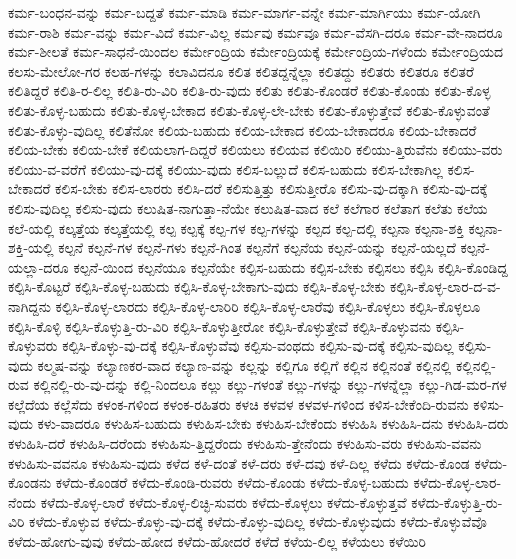 {ಕರ್ಮ-ಬಂಧನ-ವನ್ನು
ಕರ್ಮ-ಬದ್ದತೆ
ಕರ್ಮ-ಮಾಡಿ
ಕರ್ಮ-ಮಾರ್ಗ-ವನ್ನೇ
ಕರ್ಮ-ಮಾರ್ಗಿಯು
ಕರ್ಮ-ಯೋಗಿ
ಕರ್ಮ-ರಾಶಿ
ಕರ್ಮ-ವನ್ನು
ಕರ್ಮ-ವಿದೆ
ಕರ್ಮ-ವಿಲ್ಲ
ಕರ್ಮವು
ಕರ್ಮವೂ
ಕರ್ಮ-ವೆಸಗಿ-ದರೂ
ಕರ್ಮ-ವೇ-ನಾದರೂ
ಕರ್ಮ-ಶೀಲತೆ
ಕರ್ಮ-ಸಾಧನೆ-ಯಿಂದಲ
ಕರ್ಮೇಂದ್ರಿಯ
ಕರ್ಮೇಂದ್ರಿಯಕ್ಕೆ
ಕರ್ಮೇಂದ್ರಿಯ-ಗಳೆಂದು
ಕರ್ಮೇಂದ್ರಿಯದ
ಕಲಸು-ಮೇಲೋ-ಗರ
ಕಲಹ-ಗಳನ್ನು
ಕಲಾವಿದನೂ
ಕಲಿತ
ಕಲಿತದ್ದನ್ನೆಲ್ಲಾ
ಕಲಿತದ್ದು
ಕಲಿತರು
ಕಲಿತರೂ
ಕಲಿತರೆ
ಕಲಿತಿದ್ದರೆ
ಕಲಿತಿ-ರ-ಲಿಲ್ಲ
ಕಲಿತಿ-ರು-ವಿರಿ
ಕಲಿತಿ-ರು-ವುದು
ಕಲಿತು
ಕಲಿತು-ಕೊಂಡರೆ
ಕಲಿತು-ಕೊಂಡು
ಕಲಿತು-ಕೊಳ್ಳ
ಕಲಿತು-ಕೊಳ್ಳ-ಬಹುದು
ಕಲಿತು-ಕೊಳ್ಳ-ಬೇಕಾದ
ಕಲಿತು-ಕೊಳ್ಳ-ಲೇ-ಬೇಕು
ಕಲಿತು-ಕೊಳ್ಳುತ್ತೇವೆ
ಕಲಿತು-ಕೊಳ್ಳುವಂತೆ
ಕಲಿತು-ಕೊಳ್ಳು-ವುದಿಲ್ಲ
ಕಲಿತೆನೋ
ಕಲಿಯ-ಬಹುದು
ಕಲಿಯ-ಬೇಕಾದ
ಕಲಿಯ-ಬೇಕಾದರೂ
ಕಲಿಯ-ಬೇಕಾದರೆ
ಕಲಿಯ-ಬೇಕು
ಕಲಿಯ-ಬೇಕೆ
ಕಲಿಯಲಾಗ-ದಿದ್ದರೆ
ಕಲಿಯಲು
ಕಲಿಯವ
ಕಲಿಯಿರಿ
ಕಲಿಯು-ತ್ತಿರುವೆನು
ಕಲಿಯು-ವರು
ಕಲಿಯು-ವ-ವರೆಗೆ
ಕಲಿಯು-ವು-ದಕ್ಕೆ
ಕಲಿಯು-ವುದು
ಕಲಿಸ-ಬಲ್ಲುದೆ
ಕಲಿಸ-ಬಹುದು
ಕಲಿಸ-ಬೇಕಾಗಿಲ್ಲ
ಕಲಿಸ-ಬೇಕಾದರೆ
ಕಲಿಸ-ಬೇಕು
ಕಲಿಸ-ಲಾರರು
ಕಲಿಸಿ-ದರೆ
ಕಲಿಸುತ್ತಿತ್ತು
ಕಲಿಸುತ್ತೀರೊ
ಕಲಿಸು-ವು-ದಕ್ಕಾಗಿ
ಕಲಿಸು-ವು-ದಕ್ಕೆ
ಕಲಿಸು-ವುದಿಲ್ಲ
ಕಲಿಸು-ವುದು
ಕಲುಷಿತ-ನಾಗುತ್ತಾ-ನೆಯೇ
ಕಲುಷಿತ-ವಾದ
ಕಲೆ
ಕಲೆಗಾರ
ಕಲೆತಾಗ
ಕಲೆತು
ಕಲೆಯ
ಕಲೆ-ಯಲ್ಲಿ
ಕಲ್ಕತ್ತೆಯ
ಕಲ್ಕತ್ತೆಯಲ್ಲಿ
ಕಲ್ಪ
ಕಲ್ಪಕ್ಕೆ
ಕಲ್ಪ-ಗಳ
ಕಲ್ಪ-ಗಳನ್ನು
ಕಲ್ಪದ
ಕಲ್ಪ-ದಲ್ಲಿ
ಕಲ್ಪನಾ
ಕಲ್ಪನಾ-ಶಕ್ತಿ
ಕಲ್ಪನಾ-ಶಕ್ತಿ-ಯಲ್ಲಿ
ಕಲ್ಪನೆ
ಕಲ್ಪನೆ-ಗಳ
ಕಲ್ಪನೆ-ಗಳು
ಕಲ್ಪನೆ-ಗಿಂತ
ಕಲ್ಪನೆಗೆ
ಕಲ್ಪನೆಯ
ಕಲ್ಪನೆ-ಯನ್ನು
ಕಲ್ಪನೆ-ಯಲ್ಲದೆ
ಕಲ್ಪನೆ-ಯಲ್ಲಾ-ದರೂ
ಕಲ್ಪನೆ-ಯಿಂದ
ಕಲ್ಪನೆಯೂ
ಕಲ್ಪನೆಯೇ
ಕಲ್ಪಿಸ-ಬಹುದು
ಕಲ್ಪಿಸ-ಬೇಕು
ಕಲ್ಪಿಸಲು
ಕಲ್ಪಿಸಿ
ಕಲ್ಪಿಸಿ-ಕೊಂಡಿದ್ದ
ಕಲ್ಪಿಸಿ-ಕೊಟ್ಟರೆ
ಕಲ್ಪಿಸಿ-ಕೊಳ್ಳ-ಬಹುದು
ಕಲ್ಪಿಸಿ-ಕೊಳ್ಳ-ಬೇಕಾಗು-ವುದು
ಕಲ್ಪಿಸಿ-ಕೊಳ್ಳ-ಬೇಕು
ಕಲ್ಪಿಸಿ-ಕೊಳ್ಳ-ಲಾರ-ದ-ವ-ನಾಗಿದ್ದನು
ಕಲ್ಪಿಸಿ-ಕೊಳ್ಳ-ಲಾರದು
ಕಲ್ಪಿಸಿ-ಕೊಳ್ಳ-ಲಾರಿರಿ
ಕಲ್ಪಿಸಿ-ಕೊಳ್ಳ-ಲಾರೆವು
ಕಲ್ಪಿಸಿ-ಕೊಳ್ಳಲು
ಕಲ್ಪಿಸಿ-ಕೊಳ್ಳಲೂ
ಕಲ್ಪಿಸಿ-ಕೊಳ್ಳಿ
ಕಲ್ಪಿಸಿ-ಕೊಳ್ಳುತ್ತಿ-ರು-ವಿರಿ
ಕಲ್ಪಿಸಿ-ಕೊಳ್ಳುತ್ತೀರೋ
ಕಲ್ಪಿಸಿ-ಕೊಳ್ಳುತ್ತೇವೆ
ಕಲ್ಪಿಸಿ-ಕೊಳ್ಳುವನು
ಕಲ್ಪಿಸಿ-ಕೊಳ್ಳುವರು
ಕಲ್ಪಿಸಿ-ಕೊಳ್ಳು-ವು-ದಕ್ಕೆ
ಕಲ್ಪಿಸಿ-ಕೊಳ್ಳುವೆವು
ಕಲ್ಪಿಸು-ವಂಥದು
ಕಲ್ಪಿಸು-ವು-ದಕ್ಕೆ
ಕಲ್ಪಿಸು-ವುದಿಲ್ಲ
ಕಲ್ಪಿಸು-ವುದು
ಕಲ್ಮಷ-ವನ್ನು
ಕಲ್ಯಾಣಕರ-ವಾದ
ಕಲ್ಯಾಣ-ವನ್ನು
ಕಲ್ಲನ್ನು
ಕಲ್ಲಿಗೂ
ಕಲ್ಲಿಗೆ
ಕಲ್ಲಿನ
ಕಲ್ಲಿನಂತೆ
ಕಲ್ಲಿನಲ್ಲಿ
ಕಲ್ಲಿನಲ್ಲಿ-ರುವ
ಕಲ್ಲಿನಲ್ಲಿ-ರು-ವು-ದನ್ನು
ಕಲ್ಲಿ-ನಿಂದಲೂ
ಕಲ್ಲು
ಕಲ್ಲು-ಗಳಂತೆ
ಕಲ್ಲು-ಗಳನ್ನು
ಕಲ್ಲು-ಗಳನ್ನೆಲ್ಲಾ
ಕಲ್ಲು-ಗಿಡ-ಮರ-ಗಳ
ಕಲ್ಲೆದೆಯ
ಕಲ್ಲೆಸೆದು
ಕಳಂಕ-ಗಳಿಂದ
ಕಳಂಕ-ರಹಿತರು
ಕಳಚಿ
ಕಳವಳ
ಕಳವಳ-ಗಳಿಂದ
ಕಳಿಸ-ಬೇಕೆಂದಿ-ರುವನು
ಕಳಿಸು-ವುದು
ಕಳು-ವಾದರೂ
ಕಳುಹಿಸ-ಬಹುದು
ಕಳುಹಿಸ-ಬೇಕು
ಕಳುಹಿಸ-ಬೇಕೆಂದು
ಕಳುಹಿಸಿ
ಕಳುಹಿಸಿ-ದನು
ಕಳುಹಿಸಿ-ದರು
ಕಳುಹಿಸಿ-ದರೆ
ಕಳುಹಿಸಿ-ದರೆಂದು
ಕಳುಹಿಸು-ತ್ತಿದ್ದರೆಂದು
ಕಳುಹಿಸು-ತ್ತೇನೆಂದು
ಕಳುಹಿಸು-ವರು
ಕಳುಹಿಸು-ವವನು
ಕಳುಹಿಸು-ವವನೂ
ಕಳುಹಿಸು-ವುದು
ಕಳೆದ
ಕಳೆ-ದಂತೆ
ಕಳೆ-ದರು
ಕಳೆ-ದವು
ಕಳೆ-ದಿಲ್ಲ
ಕಳೆದು
ಕಳೆದು-ಕೊಂಡ
ಕಳೆದು-ಕೊಂಡನು
ಕಳೆದು-ಕೊಂಡರೆ
ಕಳೆದು-ಕೊಂಡಿ-ರುವರು
ಕಳೆದು-ಕೊಂಡು
ಕಳೆದು-ಕೊಳ್ಳ-ಬಹುದು
ಕಳೆದು-ಕೊಳ್ಳ-ಲಾರ-ನೆಂದು
ಕಳೆದು-ಕೊಳ್ಳ-ಲಾರೆ
ಕಳೆದು-ಕೊಳ್ಳ-ಲಿಚ್ಛಿ-ಸುವರು
ಕಳೆದು-ಕೊಳ್ಳಲು
ಕಳೆದು-ಕೊಳ್ಳುತ್ತವೆ
ಕಳೆದು-ಕೊಳ್ಳುತ್ತಿ-ರು-ವಿರಿ
ಕಳೆದು-ಕೊಳ್ಳುವ
ಕಳೆದು-ಕೊಳ್ಳು-ವು-ದಕ್ಕೆ
ಕಳೆದು-ಕೊಳ್ಳು-ವುದಿಲ್ಲ
ಕಳೆದು-ಕೊಳ್ಳುವುದು
ಕಳೆದು-ಕೊಳ್ಳುವೆವೊ
ಕಳೆದು-ಹೋಗು-ವುವು
ಕಳೆದು-ಹೋದ
ಕಳೆದು-ಹೋದರೆ
ಕಳೆದೆ
ಕಳೆಯ-ಲಿಲ್ಲ
ಕಳೆಯಲು
ಕಳೆಯಿರಿ
}
